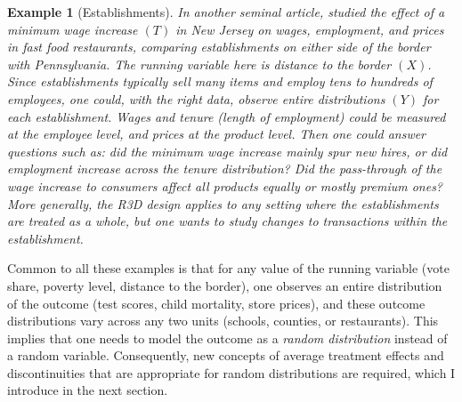 \documentclass[12pt]{article}
\newtheorem{example}{Example}
\begin{document}

\begin{example}[Establishments] \label{ex:establishment}
In another seminal article, \citet{card2000minimum} studied the effect of a minimum wage increase $(T)$ in New Jersey on wages, employment, and prices in fast food restaurants, comparing establishments on either side of the border with Pennsylvania. The running variable here is distance to the border $(X)$. Since establishments typically sell many items and employ tens to hundreds of employees, one could, with the right data, observe entire distributions $(Y)$ for each establishment. Wages and tenure (length of employment) could be measured at the employee level, and prices at the product level. Then one could answer questions such as: did the minimum wage increase mainly spur new hires, or did employment increase across the tenure distribution? Did the pass-through of the wage increase to consumers affect all products equally or mostly premium ones? More generally, the R3D design applies to any setting where the establishments are treated as a whole, but one wants to study changes to transactions within the establishment.  
\end{example}


Common to all these examples is that for any value of the running variable (vote share, poverty level, distance to the border), one observes an entire distribution of the outcome (test scores, child mortality, store prices), and these outcome distributions vary across any two units (schools, counties, or restaurants). This implies that one needs to model the outcome as a \textit{random distribution} instead of a random variable. Consequently, new concepts of average treatment effects and discontinuities that are appropriate for random distributions are required, which I introduce in the next section. 
\end{document}
